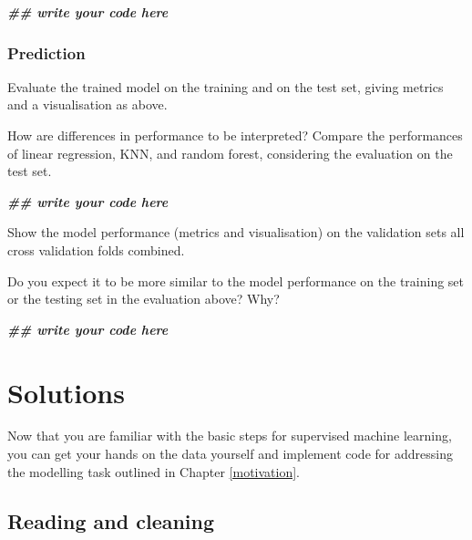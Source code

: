\documentclass[
]{book}
\newenvironment{Shaded}{\begin{snugshade}}{\end{snugshade}}
\newcommand{\DocumentationTok}[1]{\textcolor[rgb]{0.56,0.35,0.01}{\textbf{\textit{#1}}}}
\begin{document}
\begin{Shaded}
\begin{Highlighting}[]
\DocumentationTok{\#\# write your code here}
\end{Highlighting}
\end{Shaded}

\hypertarget{prediction-2}{%
\subsection{Prediction}\label{prediction-2}}

Evaluate the trained model on the training and on the test set, giving metrics and a visualisation as above.

How are differences in performance to be interpreted? Compare the performances of linear regression, KNN, and random forest, considering the evaluation on the test set.

\begin{Shaded}
\begin{Highlighting}[]
\DocumentationTok{\#\# write your code here}
\end{Highlighting}
\end{Shaded}

Show the model performance (metrics and visualisation) on the validation sets all cross validation folds combined.

Do you expect it to be more similar to the model performance on the training set or the testing set in the evaluation above? Why?

\begin{Shaded}
\begin{Highlighting}[]
\DocumentationTok{\#\# write your code here}
\end{Highlighting}
\end{Shaded}

\hypertarget{solutions}{%
\chapter{Solutions}\label{solutions}}

Now that you are familiar with the basic steps for supervised machine learning, you can get your hands on the data yourself and implement code for addressing the modelling task outlined in Chapter \ref{motivation}.

\hypertarget{reading-and-cleaning-1}{%
\section{Reading and cleaning}\label{reading-and-cleaning-1}}
\end{document}
